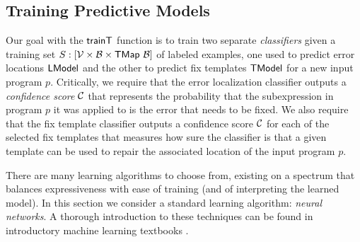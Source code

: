 \subsection{Training Predictive Models}
\label{subsec:train}
\lstDeleteShortInline{|} %

Our goal with the $\mathsf{trainT}$ function is to train two separate
\emph{classifiers} given a training set $S : [\mathcal{V} \times \mathcal{B} \times
\mathsf{TMap}\ \mathcal{B}]$ of labeled examples, one used to predict error locations $\mathsf{LModel}$
and the other to predict fix templates $\mathsf{TModel}$ for a new input program $p$.
Critically, we require that the error localization classifier outputs a
\emph{confidence score} $\mathcal{C}$ that represents the probability that the
subexpression in program $p$ it was applied to is the error that needs to be
fixed. We also require that the fix template classifier outputs a confidence
score $\mathcal{C}$ for each of the selected fix templates that measures how sure the
classifier is that a given template can be used to repair the associated
location of the input program $p$.

There are many learning algorithms to choose from, existing on a spectrum that
balances expressiveness with ease of training (and of interpreting the learned
model). In this section we consider a standard learning algorithm: \emph{neural
networks}. A thorough introduction to these techniques can be found in
introductory machine learning textbooks \citep[\eg][]{Hastie2009-bn}.



